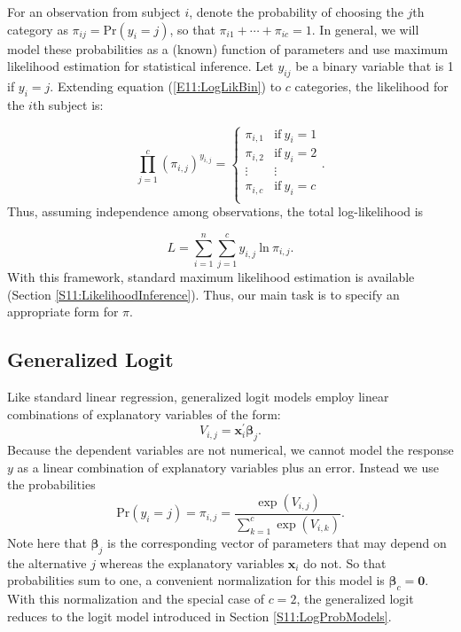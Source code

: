 For an observation from subject $i$, denote the probability of
choosing the $j$th category as $\pi_{ij}= \mathrm{Pr}(y_i = j)$, so
that $\pi_{i1}+\cdots+\pi_{ic}=1$. In general, we will model these
probabilities as a (known) function of parameters and use maximum
likelihood estimation for statistical inference. Let $y_{ij}$ be a
binary variable that is 1 if $y_i=j$. Extending equation
(\ref{E11:LogLikBin}) to $c$ categories, the likelihood for the
$i$th subject is:

\begin{equation*}
\prod_{j=1}^c \left( \pi_{i,j} \right)^{y_{i,j}} =\left\{
\begin{array}{cc}
 \pi_{i,1} & \mathrm {if}~ y_i = 1  \\
  \pi_{i,2} & \mathrm {if}~  y_i = 2  \\
  \vdots & \vdots   \\
   \pi_{i,c} & \mathrm {if}~  y_i = c  \\
\end{array}
\right. .
\end{equation*}
Thus, assuming independence among observations, the total
log-likelihood is

\begin{equation*}
L = \sum_{i=1}^n \sum_{j=1}^c y_{i,j}~ \mathrm{ln}~ \pi_{i,j} .
\end{equation*}
With this framework, standard maximum likelihood estimation is
available (Section \ref{S11:LikelihoodInference}). Thus, our main
task is to specify an appropriate form for $\pi$.

\subsection{Generalized Logit}

Like standard linear regression, generalized logit models employ
linear combinations of explanatory variables of the form:
\begin{equation}\label{E11:GeneralizedLogit}
V_{i,j} = \mathbf{x}_i^{\prime} \boldsymbol \beta_j .
\end{equation}
Because the dependent variables are not numerical, we cannot model
the response $y$ as a linear combination of explanatory variables
plus an error. Instead we use the probabilities
\begin{equation}\label{E11:GeneralizedLogitProbs}
\mathrm{Pr} \left(y_i = j \right) = \pi_{i,j} = \frac {\exp
(V_{i,j})}{\sum_{k=1}^c  \exp(V_{i,k})} .
\end{equation}
Note here that $\boldsymbol \beta_j$ is the corresponding vector of
parameters that may depend on the alternative $j$ whereas
the explanatory variables $\mathbf{x}_i$ do not. So that
probabilities sum to one, a convenient normalization for this model
is $\boldsymbol \beta_c =\mathbf{0}$. With this normalization and
the special case of $c = 2$, the generalized logit reduces to the
logit model introduced in Section \ref{S11:LogProbModels}.

